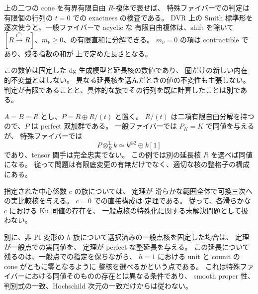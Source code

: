 \begin{remark}[行列での検査とその依存性]
\label{grl:rem:trait-smith}
上の二つの cone を有界有限自由 $R$-複体で表せば、
特殊ファイバーでの判定は有限個の行列の $t=0$ での exactness の検査である。
DVR 上の Smith 標準形を逐次使うと、一般ファイバーで acyclic な
有限自由複体は、shift を除いて
$[R\xrightarrow{t^{m_\nu}}R]$、$m_\nu\ge0$、の有限直和に分解できる。
$m_\nu=0$ の項は contractible であり、残る指数の和が
上で定めた長さとなる。

この数値は固定した dg 生成模型と延長核の数値であり、
圏だけの新しい内在的不変量とはしない。
異なる延長核を選んだときの値の不変性も主張しない。
判定が有限であることと、具体的な族でその行列を既に計算したことは別である。
\end{remark}

\begin{example}
\label{grl:ex:perfect-kernel-not-equivalence}
$A=B=R$ とし、$P=R\oplus R/(t)$ と置く。
$R/(t)$ は二項有限自由分解を持つので、$P$ は perfect 双加群である。
一般ファイバーでは $P_K=K$ で同値を与えるが、
特殊ファイバーでは
\[
 P\otimes_R^{\mathbf L}k\simeq k^{\oplus2}\oplus k[1]
\]
であり、tensor 関手は完全忠実でない。
この例では別の延長核 $R$ を選べば同値になる。
従って問題は有限底変更の有無だけでなく、適切な核の整格子の構成にある。
\end{example}

\begin{remark}[指定混合族の比較と選択済み一般点核の特殊化]
\label{grl:rem:mixed-trait-inputs}
指定された中心係数 $c$ の族については、
定理が
滑らかな範囲全体で可換三次への実比較核を与える。
$c=0$ での直接構成は
定理である。
従って、各滑らかな $c$ における Ku 同値の存在を、
一般点核の特殊化に関する未解決問題として扱わない。

別に、非 PI 変形の $h$-族について選択済みの一般点核を固定した場合は、
定理が一般点での実同値を、
定理が perfect な整延長を与える。
この延長について残るのは、一般点での指定を保ちながら、
$h=1$ における unit と counit の cone がともに零となるように
整核を選べるかという点である。
これは特殊ファイバーにおける同値そのものの存在とは異なる条件であり、
smooth proper 性、判別式の一致、Hochschild 次元の一致だけからは従わない。
\end{remark}
